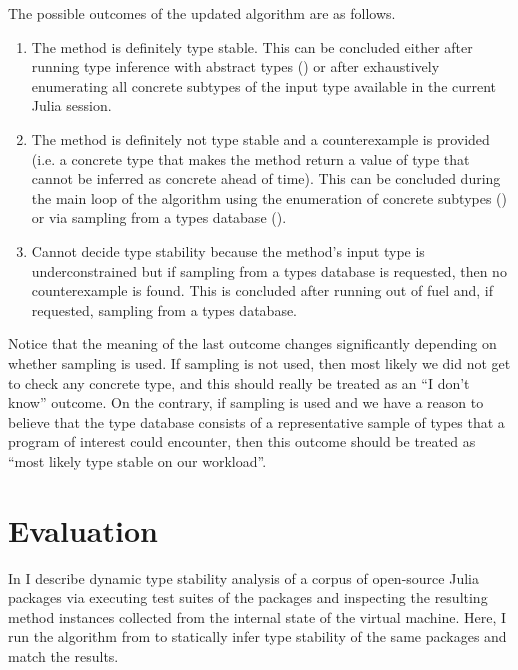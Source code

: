The possible outcomes of the updated algorithm are as follows.
\begin{enumerate}

  \item The method is definitely type stable. This can be concluded either after
  running type inference with abstract types
  () or after exhaustively enumerating all
  concrete subtypes of the input type available in the current Julia session.

  \item The method is definitely not type stable and a counterexample is provided
  (i.e. a
  concrete type that makes the method return a value of type that cannot be
  inferred as concrete ahead of time). This can be concluded during the main
  loop of the algorithm using the enumeration of concrete subtypes
  () or via
  sampling from a types database ().

  \item
  Cannot decide type stability because the method's input type is
  underconstrained but if sampling from a types database is requested, then no
  counterexample is found. This is concluded after running out
  of fuel and, if requested, sampling from a types database.
\end{enumerate}

Notice that the meaning of the last outcome changes significantly depending on whether
sampling is used. If sampling is not used, then most likely we did not get to
check any concrete type, and this should really be treated as an ``I don't know''
outcome. On the contrary, if sampling is used and we have a reason to believe
that the type database consists of a representative sample of types that a
program of interest could encounter, then this outcome should be treated as
``most likely type stable on our workload''.


\section{Evaluation}%
\label{sec:approx:eval}

In  I describe dynamic type stability analysis of a
corpus of open-source Julia packages via executing test suites of the packages and
inspecting the resulting method instances collected from the internal state of
the virtual machine. Here, I run the algorithm from  to
statically infer type stability of the same packages and match the
results.
